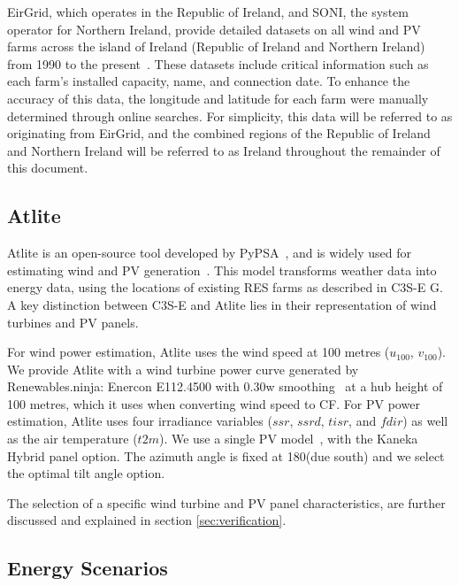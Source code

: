 \documentclass[a4paper, 11pt]{article}
\begin{document}
EirGrid, which operates in the Republic of Ireland, and SONI, the system operator for Northern Ireland, provide detailed datasets on all wind and PV farms across the island of Ireland (Republic of Ireland and Northern Ireland) from 1990 to the present~\cite{eirgrid}. These datasets include critical information such as each farm’s installed capacity, name, and connection date. To enhance the accuracy of this data, the longitude and latitude for each farm were manually determined through online searches. For simplicity, this data will be referred to as originating from EirGrid, and the combined regions of the Republic of Ireland and Northern Ireland will be referred to as Ireland throughout the remainder of this document.

\subsection{Atlite} 
\label{sec:atlite}

Atlite is an open-source tool developed by PyPSA~\cite{hofman2021atlite}, and is widely used for estimating wind and PV generation~\cite{mockert2023drought, li2023atlite, parzen2023atlite, ali2023comparative}. This model transforms weather data into energy data, using the locations of existing RES farms as described in C3S-E G. A key distinction between C3S-E and Atlite lies in their representation of wind turbines and PV panels.

For wind power estimation, Atlite uses the wind speed at 100 metres ($u_{100}$, $v_{100}$). We provide Atlite with a wind turbine power curve generated by Renewables.ninja: Enercon E112.4500 with 0.30w smoothing~\cite{staffell2016wake} at a hub height of 100 metres, which it uses when converting wind speed to CF. For PV power estimation, Atlite uses four irradiance variables ($ssr$, $ssrd$, $tisr$, and $fdir$) as well as the air temperature ($t2m$). We use a single PV model~\cite{beyer2004pv}, with the Kaneka Hybrid panel option. The azimuth angle is fixed at 180\textdegree (due south) and we select the optimal tilt angle option.

The selection of a specific wind turbine and PV panel characteristics, are further discussed and explained in section \ref{sec:verification}.

\subsection{Energy Scenarios}
\label{sec:scenarios}
\end{document}
